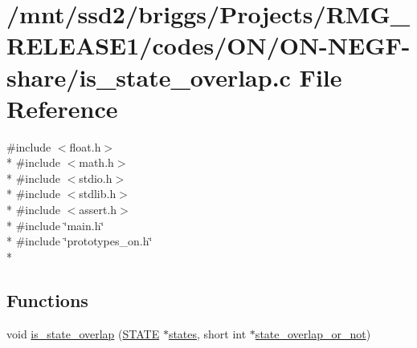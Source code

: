 \hypertarget{_o_n_2_o_n-_n_e_g_f-share_2is__state__overlap_8c}{\section{/mnt/ssd2/briggs/\-Projects/\-R\-M\-G\-\_\-\-R\-E\-L\-E\-A\-S\-E1/codes/\-O\-N/\-O\-N-\/\-N\-E\-G\-F-\/share/is\-\_\-state\-\_\-overlap.c File Reference}
\label{_o_n_2_o_n-_n_e_g_f-share_2is__state__overlap_8c}
}
{\ttfamily \#include $<$float.\-h$>$}\\*
{\ttfamily \#include $<$math.\-h$>$}\\*
{\ttfamily \#include $<$stdio.\-h$>$}\\*
{\ttfamily \#include $<$stdlib.\-h$>$}\\*
{\ttfamily \#include $<$assert.\-h$>$}\\*
{\ttfamily \#include \char`\"{}main.\-h\char`\"{}}\\*
{\ttfamily \#include \char`\"{}prototypes\-\_\-on.\-h\char`\"{}}\\*
\subsection*{Functions}
\begin{DoxyCompactItemize}
\item 
void \hyperlink{_o_n_2_o_n-_n_e_g_f-share_2is__state__overlap_8c_a97ce88d1b595ac5eb6ad23ef85267190}{is\-\_\-state\-\_\-overlap} (\hyperlink{struct_s_t_a_t_e}{S\-T\-A\-T\-E} $\ast$\hyperlink{md_8h_a286ebf6b996d2b1827eb9a889dfc83d7}{states}, short int $\ast$\hyperlink{md_8h_aada2d18bfb45e945dd9da271bac328e9}{state\-\_\-overlap\-\_\-or\-\_\-not})
\end{DoxyCompactItemize}


